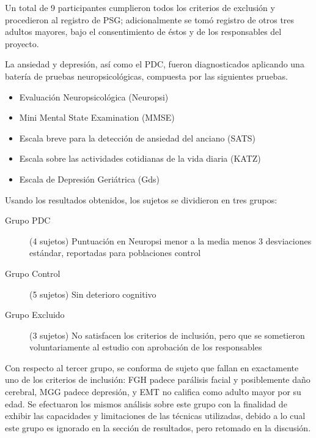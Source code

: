 \documentclass[12pt,a4paper]{mitthesis}
\begin{document}
Un total de 9 participantes cumplieron todos los criterios de exclusi\'on y procedieron al registro 
de PSG; adicionalmente se tom\'o registro de otros tres adultos mayores, bajo
el consentimiento de \'estos y de los responsables del proyecto.

La ansiedad y depresi\'on, as\'i como el PDC, fueron diagnosticados aplicando una bater\'ia de
pruebas neuropsicol\'ogicas, compuesta por las siguientes pruebas. 

\begin{itemize}
\item {Evaluaci\'on Neuropsicol\'ogica (Neuropsi)} \cite{Solis03}
\item {Mini Mental State Examination (MMSE)} \cite{Velasco15}
\item {Escala breve para la detecci\'on de ansiedad del anciano (SATS)} \cite{Vargas11}
\item {Escala sobre las actividades cotidianas de la vida diaria (KATZ)} \cite{Roumec14}
\item {Escala de Depresi\'on Geri\'atrica (Gds)} \cite{Greenberg12,Cuijpers13}
\end{itemize}

Usando los resultados obtenidos, los sujetos se dividieron en tres grupos:
\begin{description}
\item[Grupo PDC] (4 sujetos) Puntuaci\'on en Neuropsi menor a la media menos 3 desviaciones 
est\'andar, reportadas para poblaciones control \cite{Solis03}
\item[Grupo Control] (5 sujetos) Sin deterioro cognitivo
\item[Grupo Excluido] (3 sujetos) No satisfacen los criterios de inclusi\'on, pero que se 
sometieron voluntariamente al estudio con aprobaci\'on de los responsables
\end{description}

Con respecto al tercer grupo, se conforma de sujeto que fallan en exactamente uno de los criterios 
de inclusi\'on: FGH padece par\'alisis facial y posiblemente da\~no cerebral, MGG padece 
depresi\'on, y EMT no califica como adulto mayor por su edad.
Se efectuaron los mismos an\'alisis sobre este grupo con la finalidad de exhibir las capacidades y
limitaciones de las t\'ecnicas utilizadas, debido a lo cual este grupo es ignorado en la secci\'on 
de resultados, pero retomado en la discusi\'on.
\end{document}
